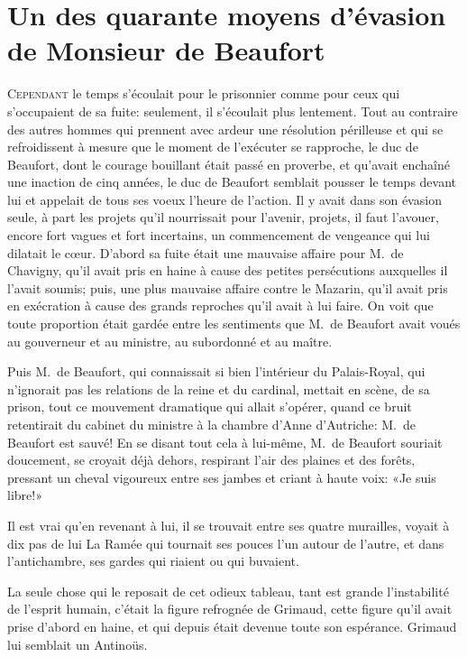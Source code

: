 \chapter{Un des quarante moyens d'évasion de Monsieur de Beaufort}

\lettrine{C}{ependant} le temps s'écoulait pour le prisonnier comme pour ceux qui s'occupaient de sa fuite: seulement, il s'écoulait plus lentement. Tout au contraire des autres hommes qui prennent avec ardeur une résolution périlleuse et qui se refroidissent à mesure que le moment de l'exécuter se rapproche, le duc de Beaufort, dont le courage bouillant était passé en proverbe, et qu'avait enchaîné une inaction de cinq années, le duc de Beaufort semblait pousser le temps devant lui et appelait de tous ses voeux l'heure de l'action. Il y avait dans son évasion seule, à part les projets qu'il nourrissait pour l'avenir, projets, il faut l'avouer, encore fort vagues et fort incertains, un commencement de vengeance qui lui dilatait le cœur. D'abord sa fuite était une mauvaise affaire pour M.~de Chavigny, qu'il avait pris en haine à cause des petites persécutions auxquelles il l'avait soumis; puis, une plus mauvaise affaire contre le Mazarin, qu'il avait pris en exécration à cause des grands reproches qu'il avait à lui faire. On voit que toute proportion était gardée entre les sentiments que M.~de Beaufort avait voués au gouverneur et au ministre, au subordonné et au maître.

Puis M.~de Beaufort, qui connaissait si bien l'intérieur du Palais-Royal, qui n'ignorait pas les relations de la reine et du cardinal, mettait en scène, de sa prison, tout ce mouvement dramatique qui allait s'opérer, quand ce bruit retentirait du cabinet du ministre à la chambre d'Anne d'Autriche: M.~de Beaufort est sauvé! En se disant tout cela à lui-même, M.~de Beaufort souriait doucement, se croyait déjà dehors, respirant l'air des plaines et des forêts, pressant un cheval vigoureux entre ses jambes et criant à haute voix: «Je suis libre!»

Il est vrai qu'en revenant à lui, il se trouvait entre ses quatre murailles, voyait à dix pas de lui La Ramée qui tournait ses pouces l'un autour de l'autre, et dans l'antichambre, ses gardes qui riaient ou qui buvaient.

La seule chose qui le reposait de cet odieux tableau, tant est grande l'instabilité de l'esprit humain, c'était la figure refrognée de Grimaud, cette figure qu'il avait prise d'abord en haine, et qui depuis était devenue toute son espérance. Grimaud lui semblait un Antinoüs.

